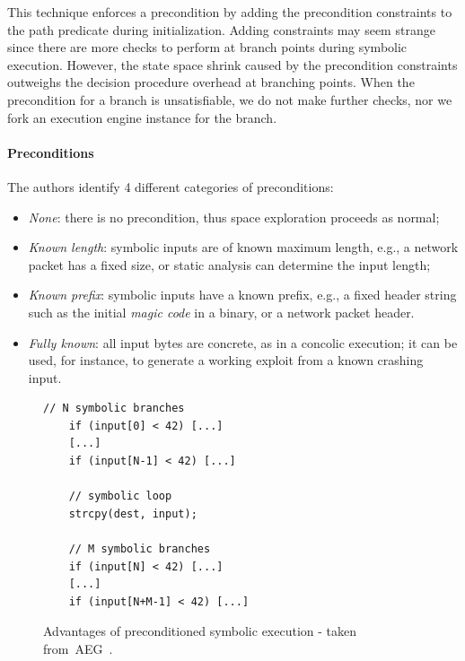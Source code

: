 This technique enforces a precondition by adding the precondition constraints to the path predicate during initialization. Adding constraints may seem strange since there are more checks to perform at branch points during symbolic execution. However, the state space shrink caused by the precondition constraints outweighs the decision procedure overhead at branching points. When the precondition for a branch is unsatisfiable, we do not make further checks, nor we fork an execution engine instance for the branch.%

\paragraph{Preconditions} The authors identify 4 different categories of preconditions:
\begin{itemize}
\item {\em None}: there is no precondition, thus space exploration proceeds as normal;
\item {\em Known length}: symbolic inputs are of known maximum length, e.g., a network packet has a fixed size, or static analysis can determine the input length;
\item {\em Known prefix}: symbolic inputs have a known prefix, e.g., a fixed header string such as the initial {\em magic code} in a binary, or a network packet header.
\item {\em Fully known}: all input bytes are concrete, as in a concolic execution; it can be used, for instance, to generate a working exploit from a known crashing input. 
\end{itemize}

\begin{figure}[t]
\begin{small}
\begin{lstlisting}[basicstyle=\ttfamily\small]
    // N symbolic branches 
    if (input[0] < 42) [...]
    [...]
    if (input[N-1] < 42) [...]

    // symbolic loop
    strcpy(dest, input); 

    // M symbolic branches
    if (input[N] < 42) [...]
    [...]
    if (input[N+M-1] < 42) [...]
\end{lstlisting}
\end{small}
\caption{\label{fig:preconditioned} Advantages of preconditioned symbolic execution - taken from~{\sc AEG}~\protect\cite{AEG-NDSS11}.}
\end{figure}

